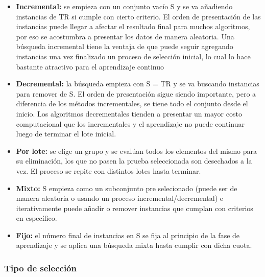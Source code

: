 \begin{itemize}
\item \textbf{Incremental:}
se empieza con un conjunto vacío S y se va añadiendo instancias de TR si cumple con cierto criterio. El orden de presentación de las instancias puede llegar a afectar el resultado final para muchos algoritmos, por eso se acostumbra a presentar los datos de manera aleatoria. Una búsqueda incremental tiene la ventaja de que puede seguir agregando instancias una vez finalizado un proceso de selección inicial, lo cual lo hace bastante atractivo para el aprendizaje continuo

\item \textbf{Decremental:}
la búsqueda empieza con S = TR y se va buscando instancias para remover de S. El orden de presentación sigue siendo importante, pero a diferencia de los métodos incrementales, se tiene todo el conjunto desde el inicio. Los algoritmos decrementales tienden a presentar un mayor costo computacional que los incrementales y el aprendizaje no puede continuar luego de terminar el lote inicial.

\item \textbf{Por lote:}
se elige un grupo y se evalúan todos los elementos del mismo para su eliminación, los que no pasen la prueba seleccionada son desechados a la vez. El proceso se repite con distintos lotes hasta terminar.

\item \textbf{Mixto:}
S empieza como un subconjunto pre selecionado (puede ser de manera aleatoria o usando un proceso incremental/decremental) e iterativamente puede añadir o remover instancias que cumplan con criterios en específico.

\item \textbf{Fijo:}
el número final de instancias en S se fija al principio de la fase de aprendizaje y se aplica una búsqueda mixta hasta cumplir con dicha cuota.
\end{itemize}

\subsubsection{Tipo de selección}

